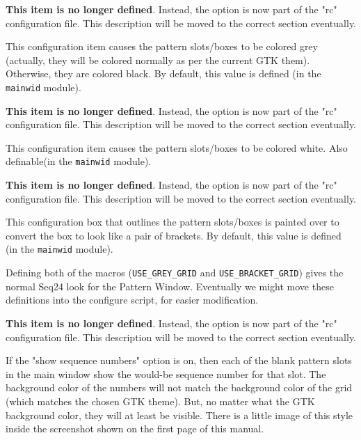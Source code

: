         \textbf{This item is no longer defined}.
        Instead, the option is now part of the "rc" configuration file.  This
        description will be moved to the correct section eventually.

        This configuration item causes the pattern slots/boxes to be colored
        grey (actually, they will be colored normally as per the current GTK
        them).  Otherwise, they are colored black.  By default, this value is
        defined (in the \texttt{mainwid} module).

        \textbf{This item is no longer defined}.
        Instead, the option is now part of the "rc" configuration file.  This
        description will be moved to the correct section eventually.

        This configuration item causes the pattern slots/boxes to be colored
        white.  Also definable(in the \texttt{mainwid} module).

        \textbf{This item is no longer defined}.
        Instead, the option is now part of the "rc" configuration file.  This
        description will be moved to the correct section eventually.

        This configuration box that outlines the pattern slots/boxes is
        painted over to convert the box to look like a pair of brackets.
        By default, this value is defined (in the \texttt{mainwid} module).

        Defining both of the macros (\texttt{USE\_GREY\_GRID} and
        \texttt{USE\_BRACKET\_GRID}) gives the normal Seq24 look for the Pattern
        Window.  Eventually we might move these definitions into the configure
        script, for easier
        modification.

        \textbf{This item is no longer defined}.
        Instead, the option is now part of the "rc" configuration file.  This
        description will be moved to the correct section eventually.

        If the "show sequence numbers" option is on, then each
        of the blank pattern slots in the main window show the would-be
        sequence number for that slot.  The background color of the numbers
        will not match the background color of the grid (which matches the
        chosen GTK theme).  But, no matter what the GTK background color, they
        will at least be visible.  There is a little image of this style inside
        the screenshot shown on the first page of this manual.

